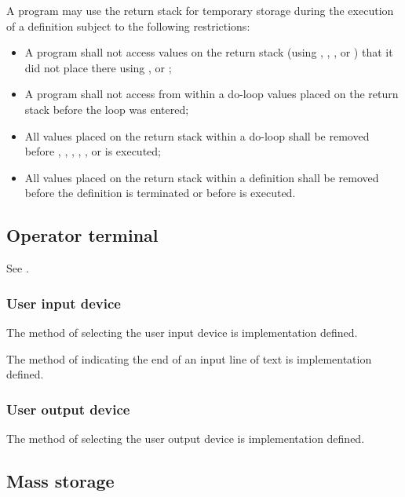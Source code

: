 A program may use the return stack for temporary storage during the
execution of a definition subject to the following restrictions:

\begin{itemize}
\item A program shall not access values on the return stack
	(using , , , 
	or ) that it did not place there using
	,	 or ;

\item A program shall not access from within a do-loop values
	placed on the return stack before the loop was entered;

\item All values placed on the return stack within a do-loop
	shall be removed before , , ,
	, , or  is executed;

\item All values placed on the return stack within a definition
	shall be removed before the definition is terminated or
	before  is executed.
\end{itemize}

\subsection{Operator terminal} %

See .

\subsubsection{User input device} %
\label{usage:input}

The method of selecting the user input device is implementation
defined.

The method of indicating the end of an input line of text is
implementation defined.

\subsubsection{User output device} %
\label{usage:output}

The method of selecting the user output device is implementation
defined.

\subsection{Mass storage} %
\label{usage:mass}

